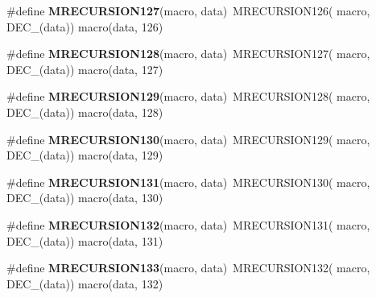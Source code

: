 \begin{DoxyCompactItemize}
\item 
\hypertarget{group__group__sam0__utils__mrecursion_gaea7381171385b03934547affe3c25d40}{}\#define {\bfseries M\+R\+E\+C\+U\+R\+S\+I\+O\+N127}(macro,  data)~M\+R\+E\+C\+U\+R\+S\+I\+O\+N126(  macro, D\+E\+C\+\_\+(data))   macro(data, 126)\label{group__group__sam0__utils__mrecursion_gaea7381171385b03934547affe3c25d40}

\item 
\hypertarget{group__group__sam0__utils__mrecursion_ga5c2aeada031c5a2154dcff155a117fb8}{}\#define {\bfseries M\+R\+E\+C\+U\+R\+S\+I\+O\+N128}(macro,  data)~M\+R\+E\+C\+U\+R\+S\+I\+O\+N127(  macro, D\+E\+C\+\_\+(data))   macro(data, 127)\label{group__group__sam0__utils__mrecursion_ga5c2aeada031c5a2154dcff155a117fb8}

\item 
\hypertarget{group__group__sam0__utils__mrecursion_gad2b53c67fce0357e4fe34a21d831a002}{}\#define {\bfseries M\+R\+E\+C\+U\+R\+S\+I\+O\+N129}(macro,  data)~M\+R\+E\+C\+U\+R\+S\+I\+O\+N128(  macro, D\+E\+C\+\_\+(data))   macro(data, 128)\label{group__group__sam0__utils__mrecursion_gad2b53c67fce0357e4fe34a21d831a002}

\item 
\hypertarget{group__group__sam0__utils__mrecursion_ga64d79abf88088b86d3f99df2c575418e}{}\#define {\bfseries M\+R\+E\+C\+U\+R\+S\+I\+O\+N130}(macro,  data)~M\+R\+E\+C\+U\+R\+S\+I\+O\+N129(  macro, D\+E\+C\+\_\+(data))   macro(data, 129)\label{group__group__sam0__utils__mrecursion_ga64d79abf88088b86d3f99df2c575418e}

\item 
\hypertarget{group__group__sam0__utils__mrecursion_ga7928b50c50f48c1ee87afe5d3d1897d6}{}\#define {\bfseries M\+R\+E\+C\+U\+R\+S\+I\+O\+N131}(macro,  data)~M\+R\+E\+C\+U\+R\+S\+I\+O\+N130(  macro, D\+E\+C\+\_\+(data))   macro(data, 130)\label{group__group__sam0__utils__mrecursion_ga7928b50c50f48c1ee87afe5d3d1897d6}

\item 
\hypertarget{group__group__sam0__utils__mrecursion_ga77488df7e435bb14b20305e9c6c19977}{}\#define {\bfseries M\+R\+E\+C\+U\+R\+S\+I\+O\+N132}(macro,  data)~M\+R\+E\+C\+U\+R\+S\+I\+O\+N131(  macro, D\+E\+C\+\_\+(data))   macro(data, 131)\label{group__group__sam0__utils__mrecursion_ga77488df7e435bb14b20305e9c6c19977}

\item 
\hypertarget{group__group__sam0__utils__mrecursion_ga8470b5ef07ccf697497fb46ced78884e}{}\#define {\bfseries M\+R\+E\+C\+U\+R\+S\+I\+O\+N133}(macro,  data)~M\+R\+E\+C\+U\+R\+S\+I\+O\+N132(  macro, D\+E\+C\+\_\+(data))   macro(data, 132)\label{group__group__sam0__utils__mrecursion_ga8470b5ef07ccf697497fb46ced78884e}


\end{DoxyCompactItemize}
